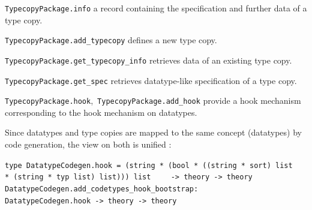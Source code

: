 \begin{isabellebody}
\begin{isamarkuptext}
  \begin{description}

  \item \verb|TypecopyPackage.info| a record containing
     the specification and further data of a type copy.

  \item \verb|TypecopyPackage.add_typecopy| defines a new
     type copy.

  \item \verb|TypecopyPackage.get_typecopy_info| retrieves
     data of an existing type copy.

  \item \verb|TypecopyPackage.get_spec| retrieves datatype-like
     specification of a type copy.

  \item \verb|TypecopyPackage.hook|,~\verb|TypecopyPackage.add_hook|
     provide a hook mechanism corresponding to the hook mechanism
     on datatypes.

  \end{description}%
\end{isamarkuptext}%
\isamarkuptrue%
%
\endisatagmlref
{\isafoldmlref}%
%
\isadelimmlref
%
\endisadelimmlref
%
\isamarkuptrue%
%
\begin{isamarkuptext}%
Since datatypes and type copies are mapped to the same concept (datatypes)
  by code generation, the view on both is unified :%
\end{isamarkuptext}%
\isamarkuptrue%
%
\isadelimmlref
%
\endisadelimmlref
%
\isatagmlref
%
\begin{isamarkuptext}%
\begin{mldecls}
  \verb|type DatatypeCodegen.hook = (string * (bool * ((string * sort) list|\isasep\isanewline%
\verb|    * (string * typ list) list))) list|\isasep\isanewline%
\verb|    -> theory -> theory| \\
  \verb|DatatypeCodegen.add_codetypes_hook_bootstrap: |\isasep\isanewline%
\verb|      DatatypeCodegen.hook -> theory -> theory|
  \end{mldecls}%
\end{isamarkuptext}%
\isamarkuptrue%
%
\endisatagmlref
{\isafoldmlref}%
%
\isadelimmlref
%
\endisadelimmlref
%
\begin{isamarkuptext}%
\begin{description}


\end{description}
\end{isamarkuptext}
\end{isabellebody}
